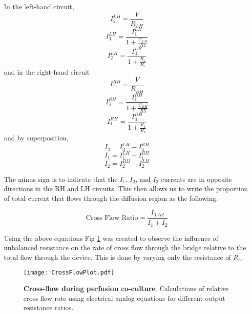 In the left-hand circuit, 
\begin{equation}
I_{2}^{LH} =\frac{V}{R_{LH}}
\end{equation}
\begin{equation}
I_{3}^{LH} =\frac{I_{1}^{LH}}{1+ \frac{C_{LH}}{R4}}
\label{equ:LHI3}
\end{equation}
\begin{equation}
I_{2}^{LH} =\frac{I_{3}^{LH}}{1+\frac{R_{2}}{R_{5}}}
\end{equation}
and in the right-hand circuit
\begin{equation}
I_{1}^{RH} =\frac{V}{R_{RH}}
\end{equation}
\begin{equation}
I_{3}^{RH} =\frac{I_{1}^{RH}}{1+ \frac{C_{RH}}{R5}}
\label{equ:LHI3b}
\end{equation}
\begin{equation}
I_{1}^{RH} =\frac{I_{3}^{RH}}{1+\frac{R_{1}}{R_{4}}}
\end{equation}
and by superposition,
\begin{equation}
I_{3} = I_{3}^{LH} - I_{3}^{RH}
\label{equ:I3}
\end{equation}
\begin{equation}
I_{1} = I_{1}^{LH} - I_{1}^{RH}
\label{equ:I1}
\end{equation}
\begin{equation}
I_{2} = I_{2}^{RH} - I_{2}^{LH}
\label{equ:I2}
\end{equation}

The minus sign is to indicate that the $I_{1}$, $I_{2}$, and $I_{3}$ currents are in opposite directions in the RH and LH circuits. This then allows us to write the proportion of total current that flows through the diffusion region as the following.

\begin{equation}
\textrm{Cross Flow Ratio} = \frac{I_{3, tot}}{I_{1} + I_{2}}
\end{equation}

Using the above equations Fig \ref{fig:crossFlow} was created to observe the influence of unbalanced resistance on the rate of cross flow through the bridge relative to the total flow through the device. This is done by varying only the resistance of $R_{5}$.

\begin{figure}[!ht]
\centering
\texttt{[image: CrossFlowPlot.pdf]}
\caption{\textbf{Cross-flow during perfusion co-culture}. Calculations of relative cross flow rate using electrical analog equations for different output resistance ratios.}
\label{fig:crossFlow}
\end{figure}

